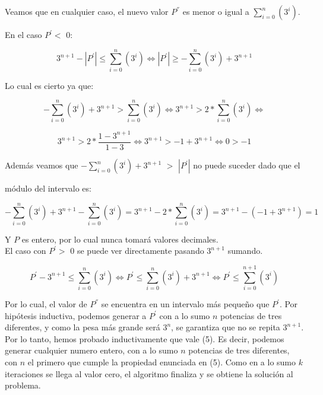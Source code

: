 Veamos que en cualquier caso, el nuevo valor $P^{''}$ es menor o igual a $\sum_{i=0}^{n}(3^i)$.

En el caso $P^{'} <$ 0:

\begin{equation}
3^{n+1} - |P^{'}| \leq \sum_{i=0}^{n}(3^i) \iff
|P^{'}| \geq - \sum_{i=0}^{n}(3^i) + 3^{n+1}
\end{equation}

Lo cual es cierto ya que:

\begin{equation}
- \sum_{i=0}^{n}(3^i) + 3^{n+1} >  \sum_{i=0}^{n}(3^i) \iff
3^{n+1} > 2 \ast \sum_{i=0}^{n}(3^i) \iff
\end{equation}

\begin{equation}
3^{n+1} > 2 \ast \frac{1-3^{n+1}}{1-3} \iff
3^{n+1} > -1+3^{n+1} \iff
0 > -1
\end{equation}

Además veamos que $- \sum_{i=0}^{n}(3^i) + 3^{n+1}$ $>$ $|P^{'}|$ no puede suceder dado que el 

m\'odulo del intervalo es:

 \begin{equation}
- \sum_{i=0}^{n}(3^i) + 3^{n+1} - \sum_{i=0}^{n}(3^i) = 
 3^{n+1} - 2 \ast \sum_{i=0}^{n}(3^i) =
 3^{n+1} - (-1 + 3^{n+1}) = 
1 
\end{equation}

Y $P$ es entero, por lo cual nunca tomará valores decimales.\\


El caso con $P^{'} >$ 0 se puede ver directamente pasando $3^{n+1}$ sumando.

\begin{equation}
P^{'} - 3^{n+1} \leq \sum_{i=0}^{n}(3^i) \iff
P^{'} \leq \sum_{i=0}^{n}(3^i) + 3^{n+1} \iff
P^{'} \leq \sum_{i=0}^{n+1}(3^i)
\end{equation}

Por lo cual, el valor de $P^{''}$ se encuentra en un intervalo m\'as pequeño que $P^{'}$. Por hipótesis inductiva, podemos generar a $P^{'}$ con a lo sumo $n$ potencias de tres diferentes, y como la pesa más grande será $3^{n}$, se garantiza que no se repita $3^{n+1}$.
Por lo tanto, hemos probado inductivamente que vale (5). Es decir, podemos generar cualquier numero entero, con a lo sumo $n$ potencias de tres diferentes, con $n$ el primero que cumple la propiedad enunciada en (5).
Como en a lo sumo $k$ iteraciones se llega al valor cero, el algoritmo finaliza y se obtiene la solución al problema.

